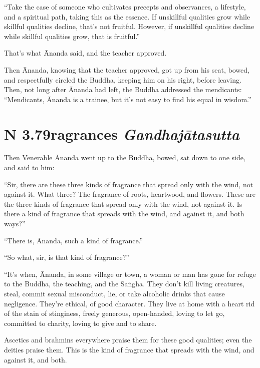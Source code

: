 \documentclass[12pt,openany]{book}%
\newcommand*{\suttatitleacronym}[1]{\smaller[2]{#1}\vspace*{.3em}}
\newcommand*{\suttatitletranslation}[1]{\linebreak{#1}}
\newcommand*{\suttatitleroot}[1]{\linebreak\smaller[2]\itshape{#1}}
\newcommand*{\tocacronym}[1]{\hspace*{-3.3em}{#1}\quad}
\newcommand*{\toctranslation}[1]{#1}
\newcommand*{\tocroot}[1]{(\textit{#1})}
\begin{document}
“Take the case of someone who cultivates precepts and observances, a lifestyle, and a spiritual path, taking this as the essence. If unskillful qualities grow while skillful qualities decline, that’s not fruitful. However, if unskillful qualities decline while skillful qualities grow, that is fruitful.” 

That’s what Ānanda said, and the teacher approved. 

Then Ānanda, knowing that the teacher approved, got up from his seat, bowed, and respectfully circled the Buddha, keeping him on his right, before leaving. Then, not long after Ānanda had left, the Buddha addressed the mendicants: “Mendicants, Ānanda is a trainee, but it’s not easy to find his equal in wisdom.” 

%
\section*{{\suttatitleacronym AN 3.79}{\suttatitletranslation Fragrances }{\suttatitleroot Gandhajātasutta}}
\addcontentsline{toc}{section}{\tocacronym{AN 3.79} \toctranslation{Fragrances } \tocroot{Gandhajātasutta}}

Then Venerable Ānanda went up to the Buddha, bowed, sat down to one side, and said to him: 

“Sir, there are these three kinds of fragrance that spread only with the wind, not against it. What three? The fragrance of roots, heartwood, and flowers. These are the three kinds of fragrance that spread only with the wind, not against it. Is there a kind of fragrance that spreads with the wind, and against it, and both ways?” 

“There is, Ānanda, such a kind of fragrance.” 

“So what, sir, is that kind of fragrance?” 

“It’s when, Ānanda, in some village or town, a woman or man has gone for refuge to the Buddha, the teaching, and the \textsanskrit{Saṅgha}. They don’t kill living creatures, steal, commit sexual misconduct, lie, or take alcoholic drinks that cause negligence. They’re ethical, of good character. They live at home with a heart rid of the stain of stinginess, freely generous, open-handed, loving to let go, committed to charity, loving to give and to share. 

Ascetics and brahmins everywhere praise them for these good qualities; even the deities praise them. This is the kind of fragrance that spreads with the wind, and against it, and both. 
\end{document}
